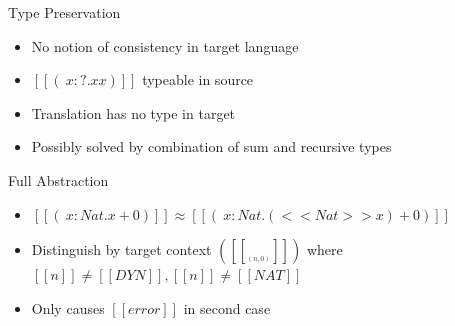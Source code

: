 \documentclass[10pt]{beamer}
\begin{document}
\begin{frame}{Type Preservation }
  \begin{itemize}
    \item No notion of consistency in target language
    \item $[[(\ x : ? . x x)]]$ typeable in source
    \item Translation has no type in target 
    \item Possibly solved by combination of sum and recursive types
  \end{itemize}
\end{frame}

\begin{frame}{Full Abstraction }
  \begin{itemize}
    \item $[[(\ x : Nat . x + 0 )]] \approx [[(\ x : Nat . (<<Nat>>x) + 0 )]]$ 
    \item Distinguish by target context  $([[  __ (n,0)  ]])$ where $[[n]]\neq[[DYN]], [[n]] \neq [[NAT]]$
    \item Only causes $[[error]]$ in second case
  \end{itemize}
\end{frame} 
\end{document}
